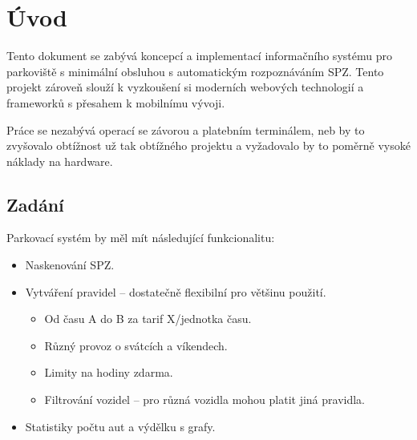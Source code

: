 \chapter{Úvod} \label{uvod}

Tento dokument se zabývá koncepcí a implementací informačního systému pro
parkoviště s minimální obsluhou s automatickým rozpoznáváním SPZ.
Tento projekt zároveň slouží k vyzkoušení si moderních webových technologií
a frameworků s přesahem k mobilnímu vývoji.

Práce se nezabývá operací se závorou a platebním terminálem, neb by to zvyšovalo
obtížnost už tak obtížného projektu a vyžadovalo by to poměrně vysoké
náklady na hardware.

\section*{Zadání}

Parkovací systém by měl mít následující funkcionalitu:

\begin{itemize}
  \setlength\itemsep{0.05em}
  \item Naskenování SPZ.
  \item Vytváření pravidel -- dostatečně flexibilní pro většinu použití.
  \begin{itemize}
    \setlength\itemsep{0.05em}
      \item Od času A do B za tarif X/jednotka času.
      \item Různý provoz o svátcích a víkendech. \label{missing1}
      \item Limity na hodiny zdarma.
      \item Filtrování vozidel -- pro různá vozidla mohou platit jiná pravidla.
    \end{itemize}
  \item Statistiky počtu aut a výdělku s grafy.
  \end{itemize}
